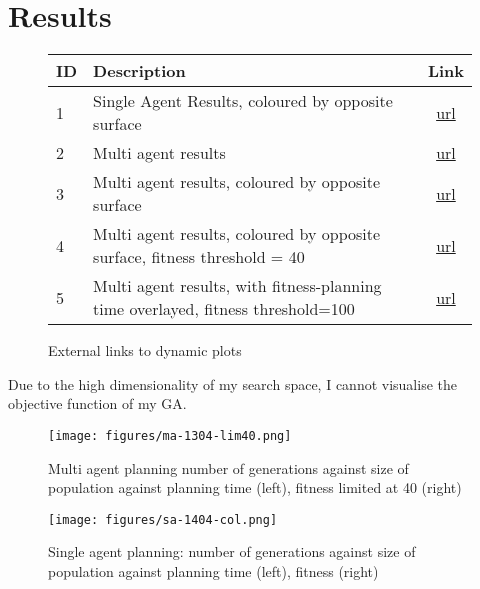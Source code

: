 \section{Results}

\begin{figure}[ht]
\centering
\begin{tabular}{| l | l | c |}
  \hline
  ID & Description & Link \\
  \hline
  1 & Single Agent Results, coloured by opposite surface& \href{https://barrett370.github.io/Y4-Diss/single-agent-result-1404-col}{url} \\
  2 & Multi agent results & \href{https://barrett370.github.io/Y4-Diss/multi-agent-result-1304}{url} \\
  3 & Multi agent results, coloured by opposite surface & \href{https://barrett370.github.io/Y4-Diss/multi-agent-result-1904-col}{url} \\
  4 & Multi agent results, coloured by opposite surface, fitness threshold = 40 & \href{https://barrett370.github.io/Y4-Diss/multi-agent-result-1304-lim40-col}{url} \\
  5 & Multi agent results, with fitness-planning time overlayed, fitness threshold=100 & \href{https://barrett370.github.io/Y4-Diss/multi-agent-result-shared-lim100}{url} \\


  \hline
\end{tabular}
\caption{\label{tab:plotlinks} External links to dynamic plots}
\end{figure}

Due to the high dimensionality of my search space, I cannot visualise the objective function of my GA.

\begin{figure}[ht]
  \centering
  \texttt{[image: figures/ma-1304-lim40.png]}
  \caption{\label{fig:ma-lim40} Multi agent planning number of generations against size of population against planning time (left), fitness limited at 40 (right)}
\end{figure}

\begin{figure}[ht]
  \centering
  \texttt{[image: figures/sa-1404-col.png]}
  \caption{\label{fig:sa-col} Single agent planning: number of generations against size of population against planning time (left), fitness (right)}
\end{figure}

